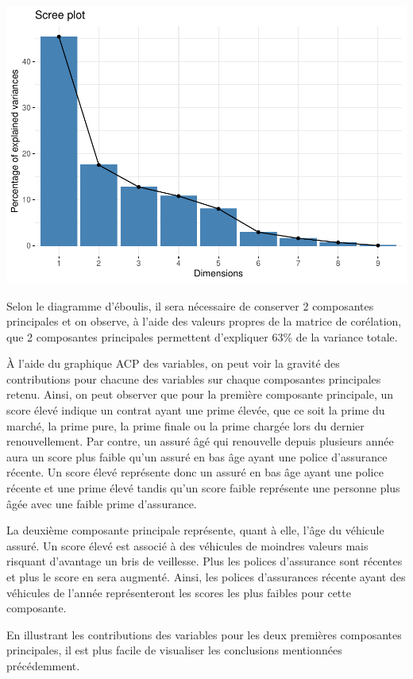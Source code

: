 \documentclass[
]{article}
\begin{document}
\includegraphics{01-01-Pretraitement_files/figure-latex/unnamed-chunk-3-1.pdf}

Selon le diagramme d'éboulis, il sera nécessaire de conserver 2
composantes principales et on observe, à l'aide des valeurs propres de
la matrice de corélation, que 2 composantes principales permettent
d'expliquer 63\% de la variance totale.

À l'aide du graphique ACP des variables, on peut voir la gravité des
contributions pour chacune des variables sur chaque composantes
principales retenu. Ainsi, on peut observer que pour la première
composante principale, un score élevé indique un contrat ayant une prime
élevée, que ce soit la prime du marché, la prime pure, la prime finale
ou la prime chargée lors du dernier renouvellement. Par contre, un
assuré âgé qui renouvelle depuis plusieurs année aura un score plus
faible qu'un assuré en bas âge ayant une police d'assurance récente. Un
score élevé représente donc un assuré en bas âge ayant une police
récente et une prime élevé tandis qu'un score faible représente une
personne plus âgée avec une faible prime d'assurance.

La deuxième composante principale représente, quant à elle, l'âge du
véhicule assuré. Un score élevé est associé à des véhicules de moindres
valeurs mais risquant d'avantage un bris de veillesse. Plus les polices
d'assurance sont récentes et plus le score en sera augmenté. Ainsi, les
polices d'assurances récente ayant des véhicules de l'année
représenteront les scores les plus faibles pour cette composante.

En illustrant les contributions des variables pour les deux premières
composantes principales, il est plus facile de visualiser les
conclusions mentionnées précédemment.
\end{document}
